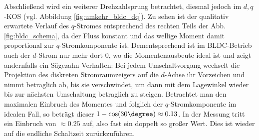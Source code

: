 \noindent Abschließend wird ein weiterer Drehzahlsprung betrachtet, diesmal jedoch im $d,q$-KOS (vgl. Abbildung \ref{fig:umkehr_bldc_dq}). Zu sehen ist der qualitativ erwartete Verlauf des $q$-Stromes entsprechend des rechten Teils der Abb. \ref{fig:bldc_schema}, da der Fluss konstant und das wellige Moment damit proportional zur $q$-Stromkomponente ist. Dementsprechend ist im BLDC-Betrieb auch der $d$-Strom nur mehr dort 0, wo die Momentenausbeute ideal ist und zeigt andernfalls ein Sägezahn-Verhalten: Bei jedem Umschaltvorgang wechselt die Projektion des diskreten Stromraumzeigers auf die $d$-Achse ihr Vorzeichen und nimmt betraglich ab, bis sie verschwindet, um dann mit dem Lagewinkel wieder bis zur nächsten Umschaltung betraglich zu steigen. Betrachtet man den maximalen Einbruch des Momentes und folglich der $q$-Stromkomponente im idealen Fall, so beträgt dieser $1-\cos(30\degree) \approx 0.13$. In der Messung tritt ein Einbruch von $\approx 0.25$ auf, also fast ein doppelt so großer Wert. Dies ist wieder auf die endliche Schaltzeit zurückzuführen.








